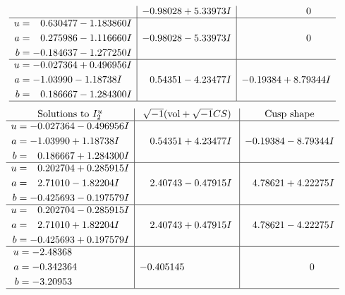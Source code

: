 \documentclass[1p]{elsarticle_modified}
\theoremstyle{definition}
\newcommand{\I}{\sqrt{-1}}
\begin{document}
$$\begin{array}{c|c|c}
 & -0.98028 + 5.33973 I & \phantom{-0.000000 } 0 \\ \hline\begin{aligned}
u &= \phantom{-}0.630477 - 1.183860 I \\
a &= \phantom{-}0.275986 - 1.116660 I \\
b &= -0.184637 - 1.277250 I\end{aligned}
 & -0.98028 - 5.33973 I & \phantom{-0.000000 } 0 \\ \hline\begin{aligned}
u &= -0.027364 + 0.496956 I \\
a &= -1.03990 - 1.18738 I \\
b &= \phantom{-}0.186667 - 1.284300 I\end{aligned}
 & \phantom{-}0.54351 - 4.23477 I & -0.19384 + 8.79344 I\\
 \hline 
 \end{array}$$\newpage$$\begin{array}{c|c|c}  
\text{Solutions to }I^u_{2}& \I (\text{vol} + \sqrt{-1}CS) & \text{Cusp shape}\\
 \hline 
\begin{aligned}
u &= -0.027364 - 0.496956 I \\
a &= -1.03990 + 1.18738 I \\
b &= \phantom{-}0.186667 + 1.284300 I\end{aligned}
 & \phantom{-}0.54351 + 4.23477 I & -0.19384 - 8.79344 I \\ \hline\begin{aligned}
u &= \phantom{-}0.202704 + 0.285915 I \\
a &= \phantom{-}2.71010 - 1.82204 I \\
b &= -0.425693 - 0.197579 I\end{aligned}
 & \phantom{-}2.40743 - 0.47915 I & \phantom{-}4.78621 + 4.22275 I \\ \hline\begin{aligned}
u &= \phantom{-}0.202704 - 0.285915 I \\
a &= \phantom{-}2.71010 + 1.82204 I \\
b &= -0.425693 + 0.197579 I\end{aligned}
 & \phantom{-}2.40743 + 0.47915 I & \phantom{-}4.78621 - 4.22275 I \\ \hline\begin{aligned}
u &= -2.48368\phantom{ +0.000000I} \\
a &= -0.342364\phantom{ +0.000000I} \\
b &= -3.20953\phantom{ +0.000000I}\end{aligned}
 & -0.405145\phantom{ +0.000000I} & \phantom{-0.000000 } 0\\
 \hline 
 \end{array}$$\newpage
\end{document}
